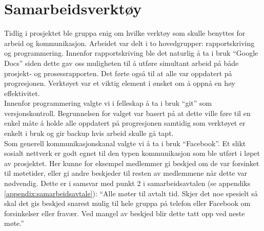 \section{Samarbeidsverktøy}
Tidlig i prosjektet ble gruppa enig om hvilke verktøy som skulle benyttes for arbeid og kommunikasjon. Arbeidet var delt i to hovedgrupper: rapportskriving og programmering. Innenfor rapportskriving ble det naturlig å ta i bruk ``Google Docs'' siden dette gav oss muligheten til å utføre simultant arbeid på både prosjekt- og prosessrapporten. Det førte også til at alle var oppdatert på progresjonen. Verktøyet var et viktig element i ønsket om å oppnå en høy effektivitet.\\

Innenfor programmering valgte vi i felleskap å ta i bruk ``git'' som versjonskontroll. Begrunnelsen for valget var basert på at dette ville føre til en enkel måte å holde alle oppdatert på progresjonen samtidig som verktøyet er enkelt i bruk og gir backup hvis arbeid skulle gå tapt.\\

Som generell kommunikasjonskanal valgte vi å ta i bruk ``Facebook''. Et slikt sosialt nettverk er godt egnet til den typen kommunikasjon som ble utført i løpet av prosjektet. Her kunne for eksempel medlemmer gi beskjed om de var forsinket til møtetider, eller gi andre beskjeder til resten av medlemmene når dette var nødvendig. Dette er i samsvar med punkt 2 i samarbeidsavtalen (se appendiks \ref{appendix:samarbeidsavtale}): ``Alle møter til avtalt tid. Skjer det noe spesielt så skal det gis beskjed snarest mulig til hele gruppa på telefon eller Facebook om forsinkelser eller fravær. Ved mangel av beskjed blir dette tatt opp ved neste møte.''\\
